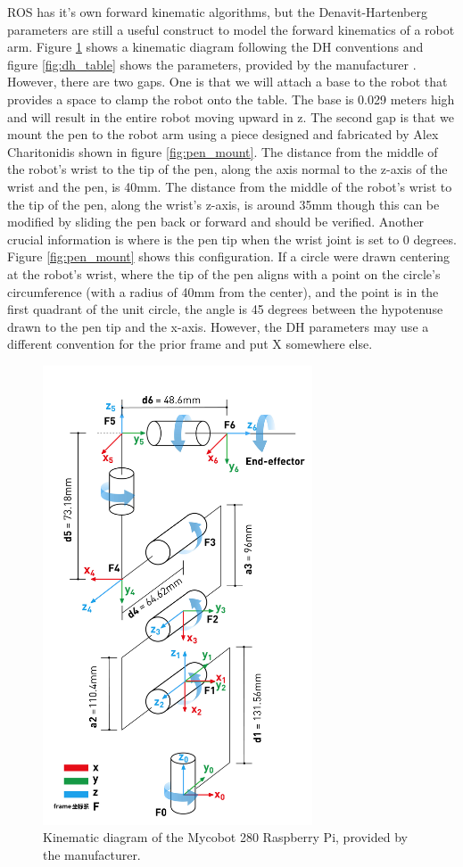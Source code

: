 \documentclass[11pt,a4paper]{article}
\begin{document}
ROS has it's own forward kinematic algorithms, but the Denavit-Hartenberg parameters are still a useful construct \cite{denavit1955kinematic} to model the forward kinematics of a robot arm. Figure \ref{fig:dh_diagram} shows a kinematic diagram following the DH conventions and figure \ref{fig:dh_table} shows the parameters, provided by the manufacturer \cite{er_dh_param}. However, there are two gaps. One is that we will attach a base to the robot that provides a space to clamp the robot onto the table. The base is 0.029 meters high and will result in the entire robot moving upward in z. The second gap is that we mount the pen to the robot arm using a piece designed and fabricated by Alex Charitonidis shown in figure \ref{fig:pen_mount}. The distance from the middle of the robot's wrist to the tip of the pen, along the axis normal to the z-axis of the wrist and the pen, is 40mm. The distance from the middle of the robot's wrist to the tip of the pen, along the wrist's z-axis, is around 35mm though this can be modified by sliding the pen back or forward and should be verified. Another crucial information is where is the pen tip when the wrist joint is set to 0 degrees. Figure \ref{fig:pen_mount} shows this configuration. If a circle were drawn centering at the robot's wrist, where the tip of the pen aligns with a point on the circle's circumference (with a radius of 40mm from the center), and the point is in the first quadrant of the unit circle, the angle is 45 degrees between the hypotenuse drawn to the pen tip and the x-axis. However, the DH parameters may use a different convention for the prior frame and put X somewhere else. 


\begin{figure}[h]
\includegraphics[width=8cm]{figures/dh_params_manufacturer.jpg}
\centering
\caption{Kinematic diagram of the Mycobot 280 Raspberry Pi, provided by the manufacturer.}
\label{fig:dh_diagram}
\end{figure}
\end{document}
